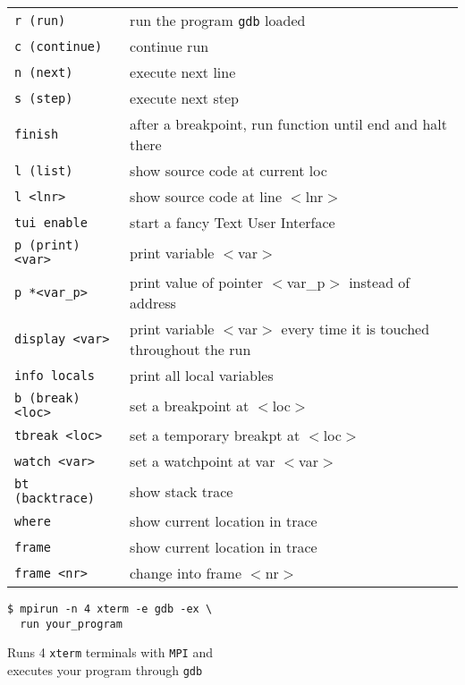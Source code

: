 \documentclass[10pt, a4paper, english, parskip, twocolumn]{scrartcl}
\newcommand{\code}[1]{\texttt{#1}}
\newcommand{\gdbsection}[1]{\begin{mdframed}[frametitlebackgroundcolor=bittersweet,style=section,
frametitle=#1]\end{mdframed}}
\begin{document}
\gdbsection{gdb basic commands}
%
{\renewcommand{\arraystretch}{1.15}%
\begin{table}[H]
\begin{center}
\begin{tabular}{p{2.8cm}p{5.4cm}}
\code{r (run)}          & run the program \code{gdb} loaded \\
\code{c (continue)}     & continue run\\
\code{n (next)}         & execute next line\\
\code{s (step)}         & execute next step\\
\code{finish}           & after a breakpoint, run function until end and halt there\\[1em]
%
\code{l (list)}         & show source code at current loc\\
\code{l <lnr>}          & show source code at line $<$lnr$>$\\
\code{tui enable}       & start a fancy Text User Interface\\[1em]
%
\code{p (print) <var>}  & print variable $<$var$>$\\
\code{p *<var\_p>}      & print value of pointer $<$var\_p$>$ instead of address\\
\code{display <var>}    & print variable $<$var$>$ every time it is touched throughout the run\\
\code{info locals}      & print all local variables\\[1em]
%
\code{b (break) <loc>}  & set a breakpoint at $<$loc$>$\\
\code{tbreak <loc>}     & set a temporary breakpt at $<$loc$>$\\
\code{watch <var>}      & set a watchpoint at var $<$var$>$\\[1em]
%
\code{bt (backtrace)}   & show stack trace\\
\code{where}            & show current location in trace\\
\code{frame}            & show current location in trace\\
\code{frame <nr>}       & change into frame $<$nr$>$
\end{tabular}
\end{center}
\end{table}
}







\gdbsection{gdb and MPI}

\begin{lstlisting}[belowskip=-0.8 \baselineskip]
$ mpirun -n 4 xterm -e gdb -ex \
  run your_program
\end{lstlisting}
\quad\quad Runs 4 \code{xterm} terminals with \code{MPI} and\\
\quad\quad executes your program through \code{gdb}
\end{document}
